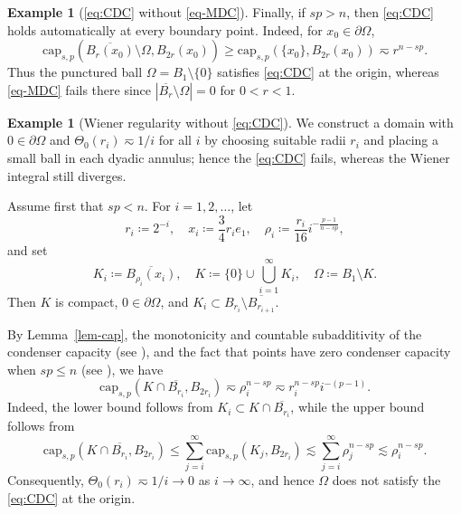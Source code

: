 \documentclass[11pt]{amsart}
\theoremstyle{plain}
\theoremstyle{definition}
\newtheorem{example}[theorem]{Example}
\numberwithin{equation}{section}
\begin{document}
\begin{example}[\eqref{eq:CDC} without \eqref{eq-MDC}]
Finally, if $sp>n$, then \eqref{eq:CDC} holds automatically at every boundary point. Indeed, for $x_0 \in \partial \Omega$,
\begin{equation*}
\mathrm{cap}_{s, p}(\overline{B_r(x_0)} \setminus \Omega, B_{2r}(x_0)) \geq \mathrm{cap}_{s, p}(\{x_0\}, B_{2r}(x_0)) \eqsim r^{n-sp}.
\end{equation*}
Thus the punctured ball $\Omega = B_1 \setminus \{0\}$ satisfies \eqref{eq:CDC} at the origin, whereas \eqref{eq-MDC} fails there since $|\overline{B_r} \setminus \Omega|=0$ for $0<r<1$.
\end{example}

\begin{example}[Wiener regularity without \eqref{eq:CDC}]\label{ex-Wiener-without-CDC}
We construct a domain with $0 \in \partial \Omega$ and $\Theta_0(r_i) \eqsim 1/i$ for all $i$ by choosing suitable radii $r_i$ and placing a small ball in each dyadic annulus; hence the \eqref{eq:CDC} fails, whereas the Wiener integral still diverges.

Assume first that $sp<n$. For $i=1, 2, \dots$, let
\begin{equation}\label{eq-radii}
r_i \coloneqq 2^{-i}, \quad x_i \coloneqq \frac{3}{4}r_i e_1, \quad \rho_i \coloneqq \frac{r_i}{16} i^{-\frac{p-1}{n-sp}},
\end{equation}
and set
\begin{equation*}
K_i \coloneqq \overline{B_{\rho_i}(x_i)}, \quad K \coloneqq \{0\} \cup \bigcup_{i=1}^\infty K_i, \quad \Omega \coloneqq B_1 \setminus K.
\end{equation*}
Then $K$ is compact, $0 \in \partial \Omega$, and $K_i \subset B_{r_i} \setminus \overline{B_{r_{i+1}}}$.

By Lemma~\ref{lem-cap}, the monotonicity and countable subadditivity of the condenser capacity (see \cite[Proposition~3.7]{BBK25}), and the fact that points have zero condenser capacity when $sp \leq n$ (see \cite[Lemma~5.5]{BBK24}), we have
\begin{equation*}
\mathrm{cap}_{s, p}(K \cap \overline{B_{r_i}}, B_{2r_i}) \eqsim \rho_i^{n-sp} \eqsim r_i^{n-sp} i^{-(p-1)}.
\end{equation*}
Indeed, the lower bound follows from $K_i \subset K \cap \overline{B_{r_i}}$, while the upper bound follows from
\begin{equation*}
\mathrm{cap}_{s, p}(K \cap \overline{B_{r_i}}, B_{2r_i}) \leq \sum_{j=i}^\infty \mathrm{cap}_{s, p}(K_j, B_{2r_i}) \lesssim \sum_{j=i}^\infty \rho_j^{n-sp} \lesssim \rho_i^{n-sp}.
\end{equation*}
Consequently, $\Theta_0(r_i) \eqsim 1/i \to 0$ as $i \to \infty$, and hence $\Omega$ does not satisfy the \eqref{eq:CDC} at the origin.


\end{example}
\end{document}
